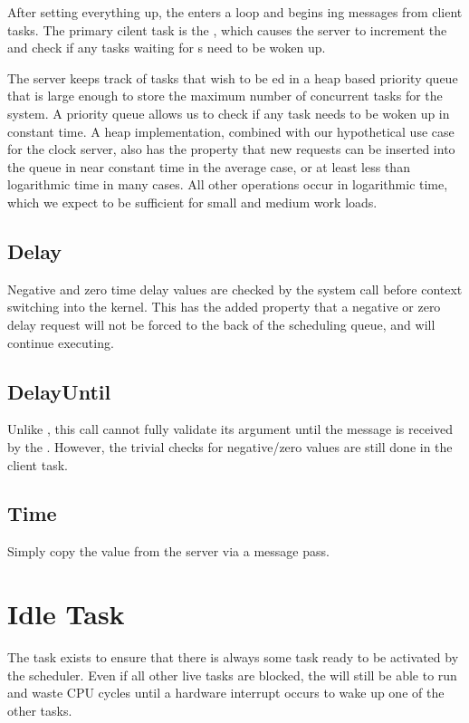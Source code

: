 \documentclass[pdftex,10pt,a4paper]{article}
\begin{document}
{{After setting everything up, the  enters a
 loop and begins ing messages from client
tasks. The primary cilent task is the , which
causes the server to increment the  and check if any tasks
waiting for s need to be woken up.

The server keeps track of tasks that wish to be ed in a
heap based priority queue that is large enough to store the maximum
number of concurrent tasks for the system. A priority queue allows us
to check if any task needs to be woken up in constant time. A heap
implementation, combined with our hypothetical use case for the clock
server, also has the property that new  requests can be
inserted into the queue in near constant time in the average case, or
at least less than logarithmic time in many cases. All other
operations occur in logarithmic time, which we expect to be sufficient
for small and medium work loads.

\subsection*{Delay}

Negative and zero time delay values are checked by the system call
before context switching into the kernel. This has the added property
that a negative or zero delay request will not be forced to the back
of the scheduling queue, and will continue executing.

\subsection*{DelayUntil}

Unlike , this call cannot fully validate its argument until
the message is received by the . However, the
trivial checks for negative/zero values are still done in the client
task.

\subsection*{Time}

Simply copy the value from the server via a message pass.

\section*{Idle Task}

The  task exists to ensure that there is always some task
ready to be activated by the scheduler. Even if all other live tasks
are blocked, the  will still be able to run and waste CPU
cycles until a hardware interrupt occurs to wake up one of the other
tasks.

}}
\end{document}
